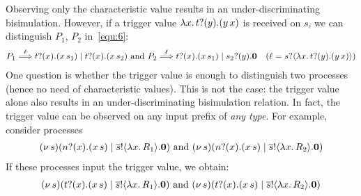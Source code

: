 \documentclass[a4paper,UKenglish]{lipics}
\theoremstyle{definition}
\begin{document}
\begin{example}
Observing only the characteristic value 
results in an under-discriminating bisimulation.
However, if a trigger value
$\lambda {x}.\,t ? (y) . (y\, {{x}})$ 
is received on $s$, 
 we can distinguish $P_1$, $P_2$ 
in~\eqref{equ:6}:  
%
\begin{eqnarray*}
	P_1 \stackrel{\ell}{\Longrightarrow} t ? (x) . (x\, {s_1}) \;|\; 
t ? (x) . (x\, {s_2})
	\mbox{~and~}
	P_2 \stackrel{\ell}{\Longrightarrow} t ? (x) . (x\, {s_1}) \;|\; s_2 ? (y) . \mathbf{0} 
\quad \text{($\ell = s?\langle \lambda {x}.\,t ? (y) . (y\, {{x}}) \rangle$)}
\end{eqnarray*}
\normalsize
%
One question is whether the trigger value is enough
to distinguish two processes (hence no need of 
characteristic values). %
This is not the case: the trigger value
alone also results in an under-discriminating bisimulation relation.
In fact, the  trigger value can be observed on any input prefix
of {\em any type}. For example, consider processes
%
\begin{eqnarray}
\newsp{s}{\binp{n}{x} (\appl{x}{s}) \Par \bout{\dual{s}}{\abs{x} R_1} \inact} 
\ \mbox{and}\ 
\newsp{s}{\binp{n}{x} (\appl{x}{s}) \Par \bout{\dual{s}}{\abs{x} R_2} \inact} 
\label{equ:7}\label{equ:8}
\end{eqnarray}
%
\noi If these processes %
input the trigger value, we obtain: %
\begin{eqnarray*}
	(\nu\, s)(t ? (x) . (x\, {s}) \;|\; \overline{s} ! \langle \lambda x.\,R_1 \rangle . \mathbf{0}) 
	\mbox{ and }
	(\nu\, s)(t ? (x) . (x\, {s}) \;|\; \overline{s} ! \langle \lambda x.\,R_2 \rangle . \mathbf{0})
\end{eqnarray*}


\end{example}
\end{document}
